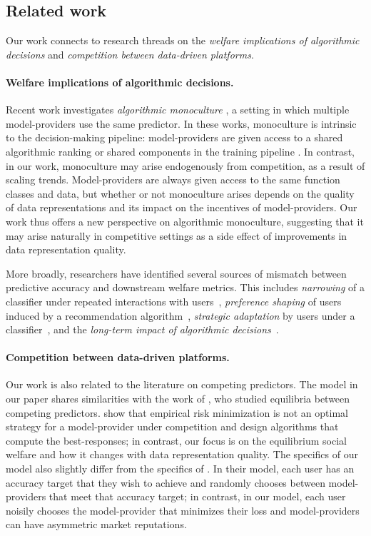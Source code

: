 \documentclass[letterpaper,11pt]{article}
\theoremstyle{plain}
\begin{document}
 

\subsection{Related work}

Our work connects to research threads on the \textit{welfare implications of algorithmic decisions} and \textit{competition between data-driven platforms}. 


\paragraph{Welfare implications of algorithmic decisions.} Recent work investigates \textit{algorithmic monoculture} \citep{KR21, BCKJL22}, a setting in which multiple model-providers use the same predictor. In these works, monoculture is  intrinsic to the decision-making pipeline: model-providers are given access to a shared algorithmic ranking \citep{KR21} or shared components in the training pipeline \citep{BCKJL22}. In contrast, in our work, monoculture may arise endogenously from competition, as a result of scaling trends. Model-providers are always given access to the same function classes and data, but whether or not monoculture arises depends on the quality of data representations and its impact on the incentives of model-providers. Our work thus offers a new perspective on algorithmic monoculture, suggesting that it may arise naturally in competitive settings as a side effect of improvements in data representation quality.

More broadly, researchers have identified several sources of mismatch between predictive accuracy and downstream welfare metrics. This includes \textit{narrowing} of a classifier under repeated interactions with users~\citep{HSNL18}, \textit{preference shaping} of users induced by a recommendation algorithm~\citep{CDHR22, DM22, CHRH22}, 
\textit{strategic adaptation} by users under a classifier~\citep{bruckner12pred, hardt16strat}, and the \textit{long-term impact of algorithmic decisions}~\citep{LDRSH18, LWHKBC20}. 

\paragraph{Competition between data-driven platforms.} Our work is also related to the literature on competing predictors. The model in our paper shares similarities with the work of \citet{BT17, BT19}, who studied equilibria between competing predictors. \citet{BT17, BT19} show that empirical risk minimization is not an optimal strategy for a model-provider under competition and design algorithms that compute the best-responses; in contrast, our focus is on the equilibrium social welfare and how it changes with data representation quality. The specifics of our model also slightly differ from the specifics of \citet{BT17, BT19}. In their model, each user has an accuracy target that they wish to achieve and randomly chooses between model-providers that meet that accuracy target; in contrast, in our model, each user noisily chooses the model-provider that minimizes their loss and model-providers can have asymmetric market reputations. 
\end{document}
